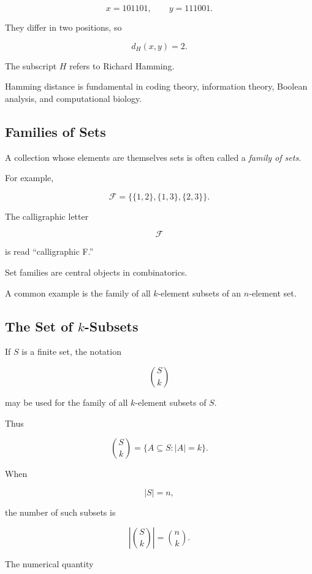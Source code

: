 \[
x=101101,
\qquad
y=111001.
\]

They differ in two positions, so

\[
\boxed{
d_H(x,y)=2.
}
\]

The subscript \(H\) refers to Richard Hamming.

Hamming distance is fundamental in coding theory, information theory,
Boolean analysis, and computational biology.

\subsection{Families of Sets}
\label{subsec:families-of-sets}

A collection whose elements are themselves sets is often called a
\emph{family of sets}.

For example,

\[
\mathcal{F}
=
\{
\{1,2\},
\{1,3\},
\{2,3\}
\}.
\]

The calligraphic letter

\[
\mathcal{F}
\]

is read ``calligraphic F.''

Set families are central objects in combinatorics.

A common example is the family of all \(k\)-element subsets of an
\(n\)-element set.

\subsection{The Set of \(k\)-Subsets}
\label{subsec:k-subsets}

If \(S\) is a finite set, the notation

\[
\boxed{
\binom{S}{k}
}
\]

may be used for the family of all \(k\)-element subsets of \(S\).

Thus

\[
\binom{S}{k}
=
\{A\subseteq S:|A|=k\}.
\]

When

\[
|S|=n,
\]

the number of such subsets is

\[
\boxed{
\left|\binom{S}{k}\right|
=
\binom{n}{k}.
}
\]

The numerical quantity

